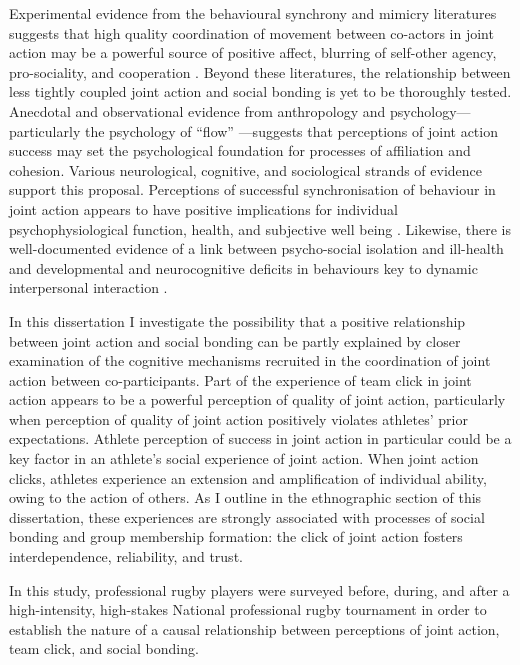 \begin{CJK}{UTF8}{gbsn}
Experimental evidence from the behavioural synchrony and mimicry literatures suggests that high quality coordination of movement between co-actors in joint action may be a powerful source of positive affect, blurring of self-other agency, pro-sociality, and cooperation \citep{Mogan2017}. Beyond these literatures, the relationship between less tightly coupled joint action and social bonding is yet to be thoroughly tested.  Anecdotal and observational evidence from anthropology and psychology---particularly the psychology of ``flow'' \citep{Csikszentmihalyi1992,Jackson1999}---suggests that perceptions of joint action success may set the psychological foundation for processes of affiliation and cohesion.  Various neurological, cognitive, and sociological strands of evidence support this proposal.  Perceptions of successful synchronisation of behaviour in joint action appears to have positive implications for individual psychophysiological function, health, and subjective well being \citep{Wheatley2012}.  Likewise, there is well-documented evidence of a link between psycho-social isolation and ill-health and developmental and neurocognitive deficits in behaviours key to dynamic interpersonal interaction \citep[e.g.][]{Blakemore2005,Baron-Cohen1991}.

In this dissertation I investigate the possibility that a positive relationship between joint action and social bonding can be partly explained by closer examination of the cognitive mechanisms recruited in the coordination of joint action between co-participants.  Part of the experience of team click in joint action appears to be a powerful perception of quality of joint action, particularly when perception of quality of joint action positively violates athletes' prior expectations.  Athlete perception of success in joint action in particular could be a key factor in an athlete's social experience of joint action.  When joint action clicks, athletes experience an extension and amplification of individual ability, owing to the action of others.  As I outline in the ethnographic section of this dissertation, these experiences are strongly associated with processes of social bonding and group membership formation: the click of joint action fosters interdependence, reliability, and trust.

In this study, professional rugby players were surveyed before, during, and after a high-intensity, high-stakes National professional rugby tournament in order to establish the nature of a causal relationship between perceptions of joint action, team click, and social bonding.


\end{CJK}
